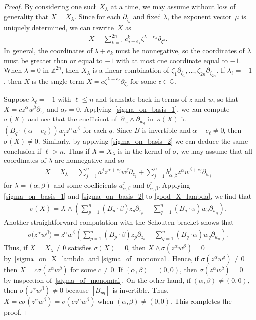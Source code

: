 \documentclass[10pt,a4paper]{amsart}
\numberwithin{equation}{section}
\begin{document}
\begin{proof}
By considering one such $X_\lambda$ at a time, we may assume without loss of generality that $X=X_\lambda$. Since for each $\partial_{\zeta_k}$ and f\/ixed $\lambda$, the exponent vector~$\mu$ is uniquely determined, we can rewrite~$X$ as
\begin{gather*}
X=\sum_{k=1}^{2n} c^k_{\lambda+e_k} \zeta^{\lambda+e_k}\partial_{\zeta^k}.
\end{gather*}
In general, the coordinates of $\lambda+e_k$ must be nonnegative, so the coordinates of $\lambda$ must be greater than or equal to $-1$ with at most one coordinate equal to $-1$. When $\lambda=0$ in ${\mathbb Z}^{2n}$, then $X_\lambda$ is a linear combination of $\zeta_1\partial_{\zeta_1},\dots,\zeta_{2n} \partial_{\zeta_{2n}}$. If $\lambda_\ell=-1$, then $X$ is the single term $X=c\zeta^{\lambda+ e_\ell}\partial_{\zeta_\ell}$ for some $c\in{\mathbb C}$.

Suppose $\lambda_\ell=-1$ with $\ell\le n$ and translate back in terms of $z$ and $w$, so that $X=cz^\alpha w^\beta \partial_{z_\ell}$ and $\alpha_\ell=0$.
Applying~\eqref{sigma_on_basis_1}, we can compute~$\sigma(X)$ and see that the coef\/f\/icient of~$\partial_{z_\ell}\wedge \partial_{w_q}$ in~$\sigma(X)$ is $(B_q\cdot (\alpha-e_\ell))w_qz^{\alpha}w^\beta$ for each $q$. Since $B$ is invertible and $\alpha-e_\ell\ne 0$, then $\sigma(X)\ne 0$. Similarly, by applying \eqref{sigma_on_basis_2} we can deduce the same conclusion if $\ell>n$. Thus if $X=X_\lambda$ is in the kernel of $\sigma$, we may assume that all coordinates of $\lambda$ are nonnegative and so
\begin{gather}\label{good_X_lambda}
X=X_\lambda=\sum_{j=1}^n a^j z^{\alpha+e_j}w^\beta \partial_{z_j}+\sum_{j=1}^n b^j_{\alpha,\beta} z^\alpha w^{\beta+e_j}\partial_{w_j}
\end{gather}
for $\lambda=(\alpha,\beta)$ and some coef\/f\/icients $a^j_{\alpha,\beta}$ and $b^j_{\alpha,\beta}$.
Applying \eqref{sigma_on_basis_1} and \eqref{sigma_on_basis_2} to \eqref{good_X_lambda}, we f\/ind that
\begin{gather}\label{sigma_on_X_lambda}
\sigma(X)=X\wedge \left(\sum_{p=1}^n (B_p\cdot \beta)z_p\partial_{z_p}-\sum_{q=1}^n (B_q\cdot \alpha) w_q\partial_{w_q}\right).
\end{gather}
Another straightforward computation with the Schouten bracket shows that
\begin{gather}\label{sigma_of_monomial}
\sigma\big(z^\alpha w^\beta\big)=z^\alpha w^\beta \left(\sum_{p=1}^n (B_p\cdot \beta)z_p\partial_{z_p}-\sum_{q=1}^n (B_q\cdot \alpha) w_q\partial_{w_q}\right).
\end{gather}
Thus, if $X=X_\lambda\not=0$ satisf\/ies $\sigma(X)=0$, then $X\wedge \sigma(z^\alpha w^\beta)=0$ by~\eqref{sigma_on_X_lambda} and \eqref{sigma_of_monomial}. Hence, if $\sigma(z^\alpha w^\beta)\not=0$ then $X=c\sigma(z^\alpha w^\beta)$ for some $c\not=0$. If $(\alpha,\beta)=(0,0)$, then $\sigma(z^\alpha w^\beta)=0$ by inspection of~\eqref{sigma_of_monomial}. On the other hand, if $(\alpha,\beta)\not=(0,0)$, then $\sigma(z^\alpha w^\beta)\not=0$ because $[B_{pq}]$ is invertible. Thus, $X=c\sigma(z^\alpha w^\beta)=\sigma(cz^\alpha w^\beta)$ when $(\alpha,\beta)\not=(0,0)$. This completes the proof.
\end{proof}
\end{document}
